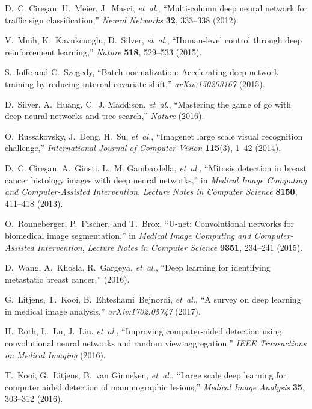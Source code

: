 \documentclass[12pt]{spieman}  %
\begin{document}
\begin{thebibliography}{10}
D.~C. Cire\c{s}an, U.~Meier, J.~Masci, {\em et~al.}, ``Multi-column deep neural
  network for traffic sign classification,'' {\em Neural Networks} {\bf 32},
  333--338  (2012).

V.~Mnih, K.~Kavukcuoglu, D.~Silver, {\em et~al.}, ``Human-level control through
  deep reinforcement learning,'' {\em Nature} {\bf 518}, 529--533  (2015).

S.~Ioffe and C.~Szegedy, ``Batch normalization: Accelerating deep network
  training by reducing internal covariate shift,'' {\em arXiv:150203167}
  (2015).

D.~Silver, A.~Huang, C.~J. Maddison, {\em et~al.}, ``Mastering the game of go
  with deep neural networks and tree search,'' {\em Nature}   (2016).

O.~Russakovsky, J.~Deng, H.~Su, {\em et~al.}, ``Imagenet large scale visual
  recognition challenge,'' {\em International Journal of Computer Vision} {\bf
  115}(3), 1--42  (2014).

D.~C. Cire\c{s}an, A.~Giusti, L.~M. Gambardella, {\em et~al.}, ``Mitosis
  detection in breast cancer histology images with deep neural networks,'' in
  {\em Medical Image Computing and Computer-Assisted Intervention},  {\em
  Lecture Notes in Computer Science} {\bf 8150}, 411--418  (2013).

O.~Ronneberger, P.~Fischer, and T.~Brox, ``U-net: Convolutional networks for
  biomedical image segmentation,'' in {\em Medical Image Computing and
  Computer-Assisted Intervention},  {\em Lecture Notes in Computer Science}
  {\bf 9351}, 234--241  (2015).

D.~Wang, A.~Khosla, R.~Gargeya, {\em et~al.}, ``Deep learning for identifying
  metastatic breast cancer,''  (2016).

G.~Litjens, T.~Kooi, B.~Ehteshami~Bejnordi, {\em et~al.}, ``A survey on deep
  learning in medical image analysis,'' {\em arXiv:1702.05747}   (2017).

H.~Roth, L.~Lu, J.~Liu, {\em et~al.}, ``Improving computer-aided detection
  using convolutional neural networks and random view aggregation,'' {\em IEEE
  Transactions on Medical Imaging}   (2016).

T.~Kooi, G.~Litjens, B.~van Ginneken, {\em et~al.}, ``Large scale deep learning
  for computer aided detection of mammographic lesions,'' {\em Medical Image
  Analysis} {\bf 35}, 303--312  (2016).


\end{thebibliography}
\end{document}
